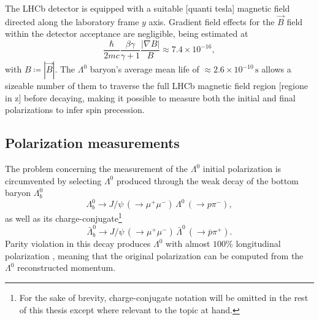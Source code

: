 
The LHCb detector is equipped with a suitable [quanti tesla] magnetic field directed along the laboratory frame $y$ axis. Gradient field effects for the $\vec{B}$ field within the detector acceptance are negligible, being estimated at \cite{EMDipoleSearch}
\begin{equation}
\frac{\hbar}{2mc} \frac{\beta\gamma}{\gamma+1} \frac{|\nabla B|}{B} \approx 7.4 \times {10}^{-16},
\end{equation}
with $B \coloneqq |\vec{B}|$. The $\Lambda^0$ baryon's average mean life of $\approx 2.6 \times {10}^{-10}\, \si{\second}$ \cite{PDG} allows a sizeable number of them to traverse the full LHCb magnetic field region [regione in z] before decaying, making it possible to measure both the initial and final polarizations to infer spin precession.


\subsection{Polarization measurements}

The problem concerning the measurement of the $\Lambda^0$ initial polarization is circumvented by selecting $\Lambda^0$ produced through the weak decay of the bottom baryon $\Lambda_b^0$
\begin{equation}
\Lambda_b^0 \rightarrow J/\psi \, (\rightarrow \mu^+ \mu^-) \,\Lambda^0 \,(\rightarrow p \pi^-),
\label{eq:demonstrator_cap1}  
\end{equation}
as well as its charge-conjugate\footnote{For the sake of brevity, charge-conjugate notation will be omitted in the rest of this thesis except where relevant to the topic at hand.}
\begin{equation}
\bar{\Lambda}_b^0 \rightarrow J/\psi \, (\rightarrow \mu^+ \mu^-) \,\bar{\Lambda}^0 \, (\rightarrow \bar{p} \pi^+).
\label{eq:antidemonstrator_cap1}  
\end{equation}
Parity violation in this decay produces $\Lambda^0$ with almost $100\%$ longitudinal polarization \cite{ATLASLambdaPolarization}, meaning that the original polarization can be computed from the $\Lambda^0$ reconstructed momentum.

